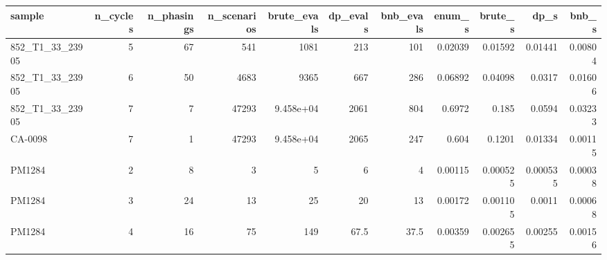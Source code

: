 \begin{tabular}{lrrrrrrrrrr}
\toprule
sample & n\_cycles & n\_phasings & n\_scenarios & brute\_evals & dp\_evals & bnb\_evals & enum\_s & brute\_s & dp\_s & bnb\_s \\
\midrule
852\_T1\_33\_23905 & 5 & 67 & 541 & 1081 & 213 & 101 & 0.02039 & 0.01592 & 0.01441 & 0.00804 \\
852\_T1\_33\_23905 & 6 & 50 & 4683 & 9365 & 667 & 286 & 0.06892 & 0.04098 & 0.0317 & 0.01606 \\
852\_T1\_33\_23905 & 7 & 7 & 47293 & 9.458e+04 & 2061 & 804 & 0.6972 & 0.185 & 0.0594 & 0.03233 \\
CA-0098 & 7 & 1 & 47293 & 9.458e+04 & 2065 & 247 & 0.604 & 0.1201 & 0.01334 & 0.00115 \\
PM1284 & 2 & 8 & 3 & 5 & 6 & 4 & 0.00115 & 0.000525 & 0.000535 & 0.00038 \\
PM1284 & 3 & 24 & 13 & 25 & 20 & 13 & 0.00172 & 0.001105 & 0.0011 & 0.00068 \\
PM1284 & 4 & 16 & 75 & 149 & 67.5 & 37.5 & 0.00359 & 0.002655 & 0.00255 & 0.00156 \\
\bottomrule
\end{tabular}
